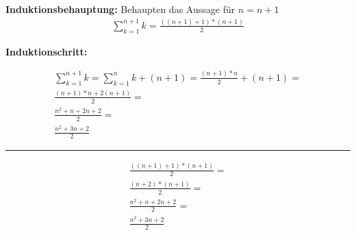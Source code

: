 \documentclass{article}
\begin{document}
\begin{multicols}{2}
\noindent \textbf{Induktionsbehauptung:} Behaupten das Aussage für $ n = n + 1 $
\begin{align*}
    \sum_{k=1}^{n + 1}k = \frac{((n + 1) + 1) * (n + 1)}{2}
\end{align*}

\noindent \textbf{Induktionschritt:}

\begin{align*}
    \sum_{k=1}^{n + 1}k  = \sum_{k=1}^{n}k + (n + 1) = \frac{(n + 1) * n}{2} +  (n + 1) = \\
    \frac{(n + 1) * n + 2(n + 1)}{2} = \\
    \frac{n^2 + n + 2n + 2}{2} = \\
    \frac{n^2 + 3n + 2}{2}
\end{align*}
\hrule
\begin{align*}
    \frac{((n + 1) + 1) * (n + 1)}{2} = \\
    \frac{(n + 2) * (n + 1)}{2} = \\
    \frac{n^2 + n +2n + 2}{2} = \\
    \frac{n^2 + 3n + 2}{2}
\end{align*}


\end{multicols}
\end{document}
